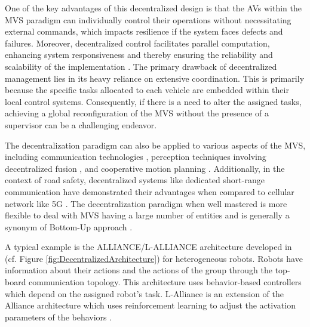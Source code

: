 One of the key advantages of this decentralized design is that the AVs within the MVS paradigm can individually control their operations without necessitating external commands, which impacts resilience if the system faces defects and failures. Moreover, decentralized control facilitates parallel computation, enhancing system responsiveness and thereby ensuring the reliability and scalability of the implementation  \cite{cao1997cooperative}\cite{feddema2002decentralized}\cite{ren2008distributed}. The primary drawback of decentralized management lies in its heavy reliance on extensive coordination. This is primarily because the specific tasks allocated to each vehicle are embedded within their local control systems. Consequently, if there is a need to alter the assigned tasks, achieving a global reconfiguration of the MVS without the presence of a supervisor can be a challenging endeavor. 

The decentralization paradigm can also be applied to various aspects of the MVS, including communication technologies \cite{abboud2016interworking}\cite{ghosal2020security}, perception techniques involving decentralized fusion \cite{winner2014handbook}, and cooperative motion planning \cite{7562449}. Additionally, in the context of road safety, decentralized systems like dedicated short-range communication have demonstrated their advantages when compared to cellular network like 5G \cite{jurgen2012v2v}\cite{harding2014vehicle}. The decentralization paradigm when well mastered is more flexible to deal with MVS having a large number of entities and is generally a synonym of Bottom-Up approach \cite{adouane2005architectures}. 

A typical example is the ALLIANCE/L-ALLIANCE architecture developed in \cite{parker1994alliance}\cite{parker1996alliance}\cite{parker1998alliance} (cf. Figure \ref{fig:DecentralizedArchitecture}) for heterogeneous robots. Robots have information about their actions and the actions of the group through the top-board communication topology. This architecture uses behavior-based controllers which depend on the assigned robot's task. L-Alliance \cite{parker1996alliance} is an extension of the Alliance architecture \cite{parker1994alliance} which uses reinforcement learning to adjust the activation parameters of the behaviors \cite{ventura2015safe}. 


